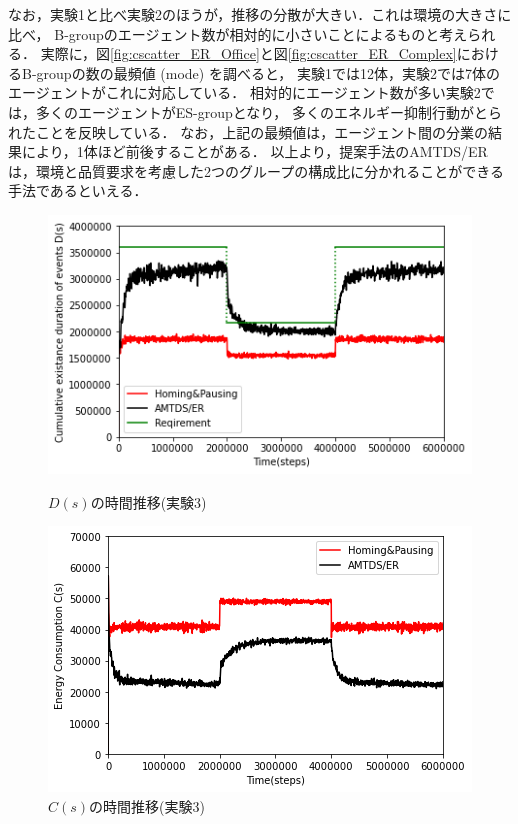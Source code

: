 \documentclass[12pt,a4j,twoside]{jarticle}
\begin{document}
  なお，実験1と比べ実験2のほうが，推移の分散が大きい．これは環境の大きさに比べ，
  B-groupのエージェント数が相対的に小さいことによるものと考えられる．
  実際に，図\ref{fig:cscatter_ER_Office}と図\ref{fig:cscatter_ER_Complex}におけるB-groupの数の最頻値 (mode) を調べると，
  実験1では12体，実験2では7体のエージェントがこれに対応している．
  相対的にエージェント数が多い実験2では，多くのエージェントがES-groupとなり，
  多くのエネルギー抑制行動がとられたことを反映している．
  なお，上記の最頻値は，エージェント間の分業の結果により，1体ほど前後することがある．
  以上より，提案手法のAMTDS/ERは，環境と品質要求を考慮した2つのグループの構成比に分かれることができる手法であるといえる．


  \begin{figure}
    \centering
    \includegraphics[width=0.9\hsize]{figures/ds_graph_3600_ave_ER_Office_600&1000.png}
    \caption{$D(s)$の時間推移(実験3)}
    \label{fig:ds_ER_ChangeRequirement}
    \hfill
    \centering
    \includegraphics[width=0.9\hsize]{figures/cs_graph_3600_ave_ER_Office_600&1000.png}
    \caption{$C(s)$の時間推移(実験3)}
    \label{fig:cs_ER_ChangeRequirement}
  \end{figure}
\end{document}
